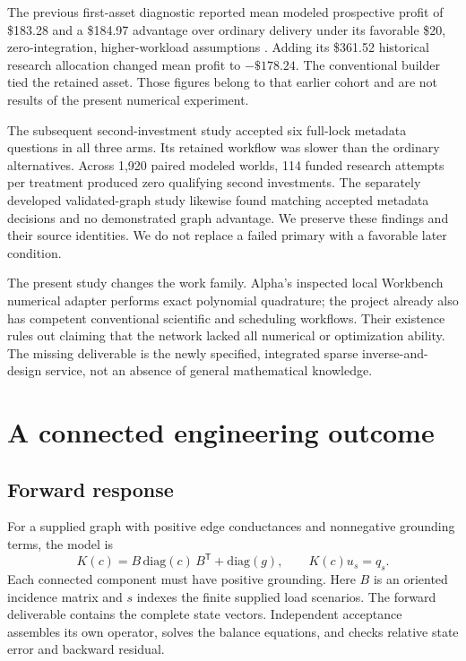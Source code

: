 \documentclass[11pt,letterpaper]{article}
\begin{document}
The previous first-asset diagnostic reported mean modeled prospective profit of \$183.28 and a \$184.97 advantage over ordinary delivery under its favorable \$20, zero-integration, higher-workload assumptions \cite{prior}. Adding its \$361.52 historical research allocation changed mean profit to $-\$178.24$. The conventional builder tied the retained asset. Those figures belong to that earlier cohort and are not results of the present numerical experiment.

The subsequent second-investment study accepted six full-lock metadata questions in all three arms. Its retained workflow was slower than the ordinary alternatives. Across 1,920 paired modeled worlds, 114 funded research attempts per treatment produced zero qualifying second investments. The separately developed validated-graph study likewise found matching accepted metadata decisions and no demonstrated graph advantage. We preserve these findings and their source identities. We do not replace a failed primary with a favorable later condition.

The present study changes the work family. Alpha's inspected local Workbench numerical adapter performs exact polynomial quadrature; the project already also has competent conventional scientific and scheduling workflows. Their existence rules out claiming that the network lacked all numerical or optimization ability. The missing deliverable is the newly specified, integrated sparse inverse-and-design service, not an absence of general mathematical knowledge.

\section{A connected engineering outcome}

\subsection{Forward response}

For a supplied graph with positive edge conductances and nonnegative grounding terms, the model is
\[
K(c) = B\,\mathrm{diag}(c)\,B^\mathsf{T}+\mathrm{diag}(g),
\qquad K(c)u_s=q_s.
\]
Each connected component must have positive grounding. Here $B$ is an oriented incidence matrix and $s$ indexes the finite supplied load scenarios. The forward deliverable contains the complete state vectors. Independent acceptance assembles its own operator, solves the balance equations, and checks relative state error and backward residual.
\end{document}
